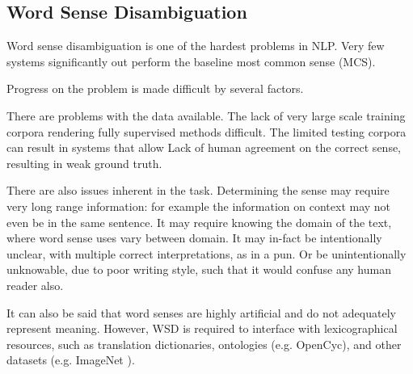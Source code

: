 \documentclass[12pt,parskip]{komatufte}
\begin{document}
\subsection{Word Sense Disambiguation}





Word sense disambiguation is one of the hardest problems in NLP.
Very few systems significantly out perform the baseline most common sense (MCS).

Progress on the problem is made difficult by several factors.

There are problems with the data available.
The lack of very large scale training corpora rendering fully supervised methods difficult.
The limited testing corpora can result in systems that allow 
Lack of human agreement on the correct sense, resulting in weak ground truth.

There are also issues inherent in the task.
Determining the sense may require very long range information:
for example the information on context may not even be in the same sentence.
It may require knowing the domain of the text, where word sense uses vary between domain.
It may in-fact be intentionally unclear, with multiple correct interpretations, as in a pun.
Or be unintentionally unknowable, due to poor writing style, such that it would confuse any human reader also.


It can also be said that word senses are highly artificial and do not adequately represent meaning.
However, WSD is required to interface with  lexicographical resources,
such as translation dictionaries, ontologies (e.g. OpenCyc), and other datasets (e.g. ImageNet ).
\end{document}
